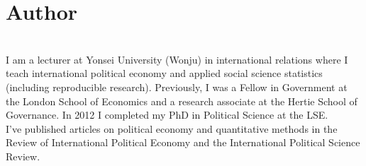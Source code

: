 {\chapter*{Author}}

 \\[1cm]

\noindent I am a lecturer at Yonsei University (Wonju) in international relations where I teach international political economy and applied social science statistics (including reproducible research). Previously, I was a Fellow in Government at the London School of Economics and a research associate at the Hertie School of Governance. In 2012 I completed my PhD in Political Science at the LSE. \\[0.25cm]

\noindent I've published articles on political economy and quantitative methods in the Review of International Political Economy and the International Political Science Review.

